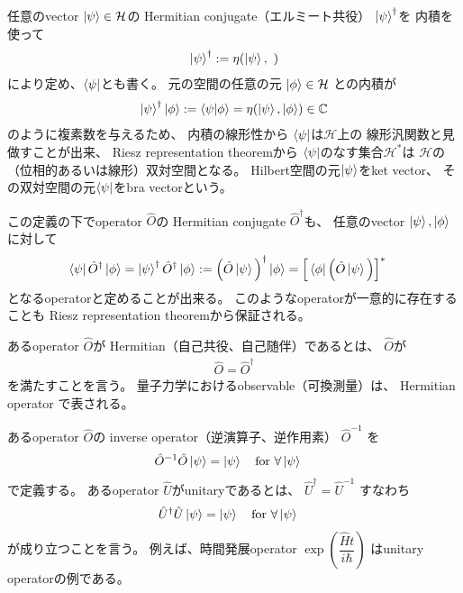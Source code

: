任意のvector $\ket{\psi} \in \mathcal{H}$の
Hermitian conjugate（エルミート共役） $\ket{\psi}^\dagger$を
内積を使って
\begin{align}
    \ket{\psi}^\dagger
    :=
    \eta(\ket{\psi},\ )
\label{bra vector}
\end{align}
により定め、$\bra{\psi}$とも書く。
元の空間の任意の元
$\ket{\phi} \in \mathcal{H}$
との内積が
\begin{align}
    \ket{\psi}^\dagger \ket{\phi}
    :=
    \braket{\psi|\phi}
    = \eta(\ket{\psi}, \ket{\phi})
    \in \mathbb{C}
\end{align}
のように複素数を与えるため、
内積の線形性から
$\bra{\psi}$は$\mathcal{H}$上の
線形汎関数と見做すことが出来、
Riesz representation theoremから
$\bra{\psi}$のなす集合$\mathcal{H}^*$は
$\mathcal{H}$の（位相的あるいは線形）双対空間となる。
Hilbert空間の元$\ket{\psi}$をket vector、
その双対空間の元$\bra{\psi}$をbra vectorという。

この定義の下でoperator $\hat{O}$の
Hermitian conjugate $\hat{O}^\dagger$も、
任意のvector $\ket{\psi}, \ket{\phi}$に対して
\begin{align}
    \bra{\psi}
    \hat{O}^\dagger
    \ket{\phi}
    =
    \ket{\psi}^\dagger
    \hat{O}^\dagger
    \ket{\phi}
    &:=
    \Big( \hat{O} \ket{\psi} \Big)^\dagger
    \ket{\phi}
    =
    \Big[
        \bra{\phi} \Big( \hat{O} \ket{\psi} \Big)
    \Big]^*
\end{align}
となるoperatorと定めることが出来る。
このようなoperatorが一意的に存在することも
Riesz representation theoremから保証される。

あるoperator $\hat{O}$が
Hermitian（自己共役、自己随伴）であるとは、
$\hat{O}$が
\begin{align}
    \hat{O} = \hat{O}^\dagger
\end{align}
を満たすことを言う。
量子力学におけるobservable（可換測量）は、
Hermitian operator で表される。

あるoperator $\hat{O}$の
inverse operator（逆演算子、逆作用素）
$\hat{O}^{-1}$
を
\begin{align}
    \hat{O}^{-1} \hat{O} \ket{\psi} &= \ket{\psi}
    \quad\text{for $\forall \ket{\psi}$}
\end{align}
で定義する。
あるoperator $\hat{U}$がunitaryであるとは、
$ \hat{U}^\dagger = \hat{U}^{-1} $
すなわち
\begin{align}
    \hat{U}^\dagger \hat{U} \ket{\psi} &= \ket{\psi}
    \quad\text{for $\forall \ket{\psi}$}
\end{align}
が成り立つことを言う。
例えば、時間発展operator
$\exp\left( \dfrac{ \hat{H}t }{i\hbar} \right)$
はunitary operatorの例である。

